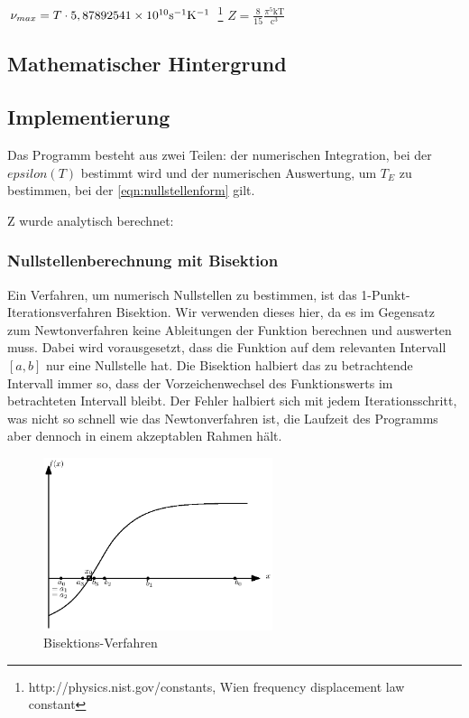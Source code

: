 \documentclass[10pt,a4paper]{article}
\begin{document}
$\nu_{max}=T\cdot 5,8789254\num{1E10}\si{\per\second}\si{\per\kelvin}$ \footnote{http://physics.nist.gov/constants, Wien frequency displacement law constant}
$Z=\frac{8}{15}\frac{\pi^5 \mathrm{kT}}{\mathrm{c}^3}$

\subsection{Mathematischer Hintergrund}

\subsection{Implementierung}

Das Programm besteht aus zwei Teilen: der numerischen Integration, bei der $epsilon(T)$ bestimmt wird und der numerischen Auswertung, um $T_E$ zu bestimmen, bei der \ref{eqn:nullstellenform} gilt.

Z wurde analytisch berechnet: 

\subsubsection{Nullstellenberechnung mit Bisektion}

Ein Verfahren, um numerisch Nullstellen zu bestimmen, ist das 1-Punkt-Iterationsverfahren Bisektion. Wir verwenden dieses hier, da es im Gegensatz zum Newtonverfahren keine Ableitungen der Funktion berechnen und auswerten muss. Dabei wird vorausgesetzt, dass die Funktion auf dem relevanten Intervall $[a,b]$ nur eine Nullstelle hat. Die Bisektion halbiert das zu betrachtende Intervall immer so, dass der Vorzeichenwechsel des Funktionswerts im betrachteten Intervall bleibt. Der Fehler halbiert sich mit jedem Iterationsschritt, was nicht so schnell wie das Newtonverfahren ist, die Laufzeit des Programms aber dennoch in einem akzeptablen Rahmen hält.
\begin{figure}[tbp]
\centering
\includegraphics[width=0.6\textwidth]{./figures/bisektion.eps}
\caption{Bisektions-Verfahren}
\label{fig:bisektion}
\end{figure}
\end{document}
